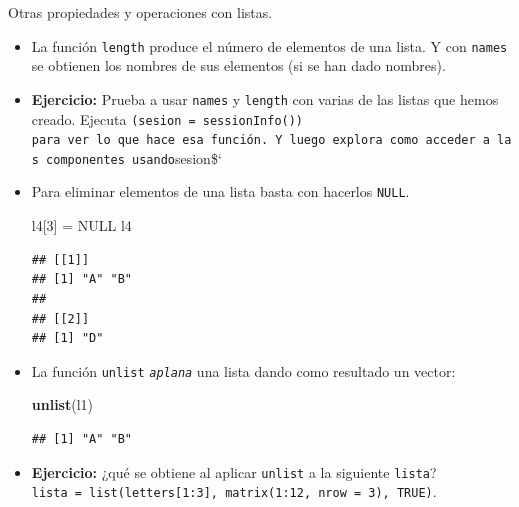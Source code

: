 \documentclass[
  9pt,
  ignorenonframetext,
]{beamer}
\newenvironment{Shaded}{\begin{snugshade}}{\end{snugshade}}
\newcommand{\DecValTok}[1]{\textcolor[rgb]{0.00,0.00,0.81}{#1}}
\newcommand{\KeywordTok}[1]{\textcolor[rgb]{0.13,0.29,0.53}{\textbf{#1}}}
\newcommand{\NormalTok}[1]{#1}
\newcommand{\OtherTok}[1]{\textcolor[rgb]{0.56,0.35,0.01}{#1}}
\newcommand{\StringTok}[1]{\textcolor[rgb]{0.31,0.60,0.02}{#1}}
\begin{document}
\begin{frame}[fragile]{Otras propiedades y operaciones con listas.}
\protect\hypertarget{otras-propiedades-y-operaciones-con-listas.}{}

\begin{itemize}
\item
  La función \texttt{length} produce el número de elementos de una
  lista. Y con \texttt{names} se obtienen los nombres de sus elementos
  (si se han dado nombres).
\item
  \textbf{Ejercicio:} Prueba a usar \texttt{names} y \texttt{length} con
  varias de las listas que hemos creado. Ejecuta
  \texttt{(sesion\ =\ sessionInfo())}
  \texttt{para\ ver\ lo\ que\ hace\ esa\ función.\ Y\ luego\ explora\ como\ acceder\ a\ las\ componentes\ usando}sesion\$`
\item
  Para eliminar elementos de una lista basta con hacerlos
  \texttt{NULL}.\small

\begin{Shaded}
\begin{Highlighting}[]
\NormalTok{l4[}\DecValTok{3}\NormalTok{] =}\StringTok{ }\OtherTok{NULL}
\NormalTok{l4}
\end{Highlighting}
\end{Shaded}

\begin{verbatim}
## [[1]]
## [1] "A" "B"
## 
## [[2]]
## [1] "D"
\end{verbatim}

  \normalsize
\item
  La función \texttt{unlist} \emph{\texttt{aplana}} una lista dando como
  resultado un vector:\small

\begin{Shaded}
\begin{Highlighting}[]
\KeywordTok{unlist}\NormalTok{(l1)}
\end{Highlighting}
\end{Shaded}

\begin{verbatim}
## [1] "A" "B"
\end{verbatim}

  \normalsize
\item
  \textbf{Ejercicio:} ¿qué se obtiene al aplicar \texttt{unlist} a la
  siguiente \texttt{lista}?\\
  \small \texttt{lista\ =\ list(letters{[}1:3{]},\ matrix(1:12,\ nrow\ =\ 3),\ TRUE)}.
  \normalsize
\end{itemize}

\end{frame}
\end{document}
